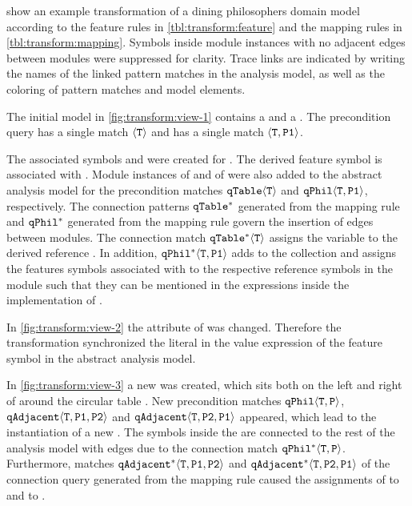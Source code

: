 \begin{runningExample}
   show an example transformation of a dining philosophers domain model according to the feature rules in \vref{tbl:transform:feature} and the mapping rules in \vref{tbl:transform:mapping}. Symbols inside module instances with no adjacent edges between modules were suppressed for clarity. Trace links are indicated by writing the names of the linked pattern matches in the analysis model, as well as the coloring of pattern matches and model elements.

  The initial model in \vref{fig:transform:view-1} contains a   and a  . The precondition query  has a single match \(\langle \texttt{\upshape T} \rangle\) and  has a single match \(\langle \texttt{\upshape T}, \texttt{\upshape P1} \rangle\).

  The associated symbols  and  were created for . The derived feature symbol  is associated with . Module instances  of  and  of  were also added to the abstract analysis model for the precondition matches \(\texttt{\upshape qTable}\langle \texttt{\upshape T} \rangle\) and \(\texttt{\upshape qPhil}\langle \texttt{\upshape T}, \texttt{\upshape P1} \rangle\), respectively. The connection patterns \(\texttt{\upshape qTable}^*\) generated from the  mapping rule and \(\texttt{\upshape qPhil}^*\) generated from the  mapping rule govern the insertion of  edges between modules. The connection match \(\texttt{\upshape qTable}^*\langle \texttt{\upshape T} \rangle\) assigns the variable  to the derived reference . In addition, \(\texttt{\upshape qPhil}^*\langle \texttt{\upshape T}, \texttt{\upshape P1} \rangle\) adds  to the collection  and assigns the features symbols associated with  to the respective reference symbols in the module  such that they can be mentioned in the expressions inside the implementation of .

  In \vref{fig:transform:view-2} the attribute  of  was changed. Therefore the transformation synchronized the literal in the value expression of the feature symbol  in the abstract analysis model.

  In \vref{fig:transform:view-3} a new   was created, which sits both on the left and right of  around the circular table . New precondition matches \(\texttt{\upshape qPhil}\langle \texttt{\upshape T}, \texttt{\upshape P} \rangle\), \(\texttt{\upshape qAdjacent}\langle \texttt{\upshape T}, \texttt{\upshape P1}, \texttt{\upshape P2} \rangle\) and \(\texttt{\upshape qAdjacent}\langle \texttt{\upshape T}, \texttt{\upshape P2}, \texttt{\upshape P1} \rangle\) appeared, which lead to the instantiation of a new  . The symbols inside the  are connected to the rest of the analysis model with edges due to the connection match \(\texttt{\upshape qPhil}^*\langle \texttt{\upshape T}, \texttt{\upshape P} \rangle\). Furthermore, matches \(\texttt{\upshape qAdjacent}^*\langle \texttt{\upshape T}, \texttt{\upshape P1}, \texttt{\upshape P2} \rangle\) and \(\texttt{\upshape qAdjacent}^*\langle \texttt{\upshape T}, \texttt{\upshape P2}, \texttt{\upshape P1} \rangle\) of the connection query generated from the mapping rule  caused the assignments of  to  and  to .


\end{runningExample}
